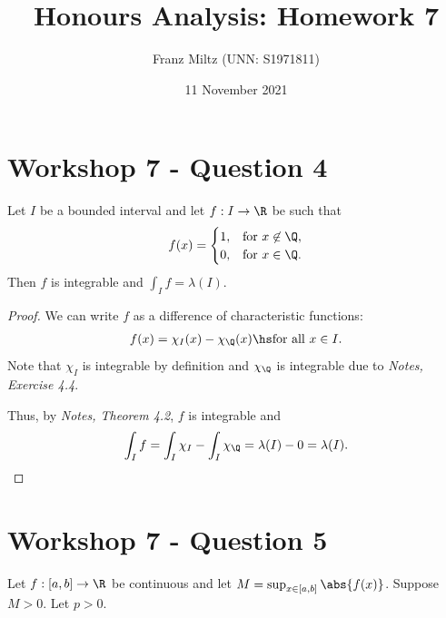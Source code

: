 \documentclass{article}
\begin{document}
\title{Honours Analysis: Homework 7}
\author{Franz Miltz (UNN: S1971811)}
\date{11 November 2021}
\maketitle

\section*{Workshop 7 - Question 4}

\begin{claim*}
   Let $I$ be a bounded interval and let $f:I\to\R$ be such that 
   \begin{align*}
      f(x) = \begin{cases}
         1, &\text{for }x\not\in\Q,\\
         0, &\text{for }x\in\Q.
      \end{cases}
   \end{align*}
   Then $f$ is integrable and $\int_I f = \lambda(I)$.
\end{claim*}
\begin{proof}
   We can write $f$ as a difference of characteristic functions:
   \begin{align*}
      f(x) = \chi_I(x) - \chi_\Q(x)\hs\text{for all }x\in I.
   \end{align*}
   Note that $\chi_I$ is integrable by definition and $\chi_\Q$ is integrable due to
   \emph{Notes, Exercise 4.4}. 
   
   Thus, by \emph{Notes, Theorem 4.2}, $f$ is integrable and 
   \begin{align*}
      \int_I f = \int_I \chi_I - \int_I \chi_\Q = \lambda(I)-0 = \lambda(I).
   \end{align*}
\end{proof}

\section*{Workshop 7 - Question 5}

Let $f:[a,b]\to\R$ be continuous and let $M=\sup_{x\in[a,b]}\abs{f(x)}$. Suppose 
$M>0$. Let $p>0$.
\end{document}
